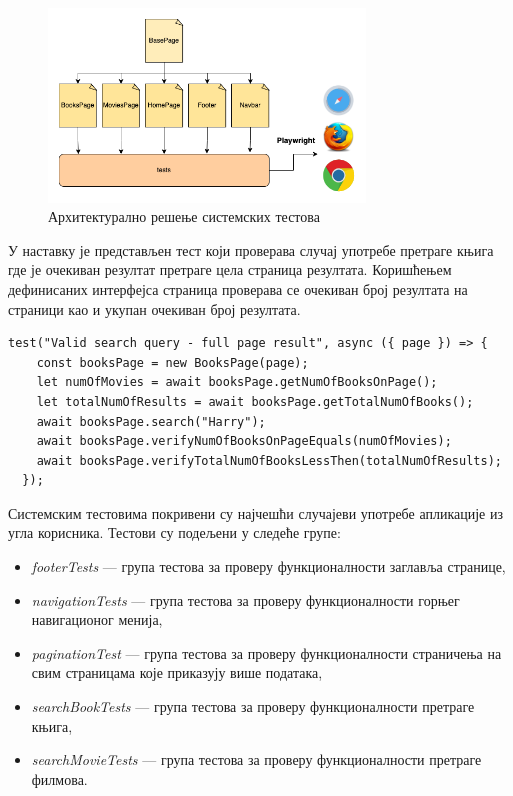 \documentclass[12pt,oneside]{memoir}
\begin{document}
\begin{figure}[!ht]
  \centering
  \includegraphics[width=0.75\textwidth]{matfmaster/img/arhitektura.png}
  \caption{Архитектурално решење системских тестова}
  \label{fig:arhitektura}
\end{figure}

У наставку је представљен тест који проверава случај употребе претраге књига где је очекиван резултат претраге цела страница резултата. Коришћењем дефинисаних интерфејса страница проверава се очекиван број резултата на страници као и укупан очекиван број резултата.


\begin{lstlisting}[caption=Тест случаја употребе --- претрага књига, 
label={lst:pretragaKnjiga},
frame=single]
 test("Valid search query - full page result", async ({ page }) => {
    const booksPage = new BooksPage(page);
    let numOfMovies = await booksPage.getNumOfBooksOnPage();
    let totalNumOfResults = await booksPage.getTotalNumOfBooks();
    await booksPage.search("Harry");
    await booksPage.verifyNumOfBooksOnPageEquals(numOfMovies);
    await booksPage.verifyTotalNumOfBooksLessThen(totalNumOfResults);
  });
\end{lstlisting}

Системским тестовима покривени су најчешћи случајеви употребе апликације из угла корисника. Тестови су подељени у следеће групе:
\begin{itemize}
\item \textit{footerTests} --- група тестова за проверу функционалности заглавља странице,
\item \textit{navigationTests} --- група тестова за проверу функционалности горњег навигационог менија,
\item \textit{paginationTest} --- група тестова за проверу функционалности страничења на свим страницама које приказују више података,
\item \textit{searchBookTests} --- група тестова за проверу функционалности претраге књига,
\item \textit{searchMovieTests} --- група тестова за проверу функционалности претраге филмова.
\end{itemize}
\end{document}

